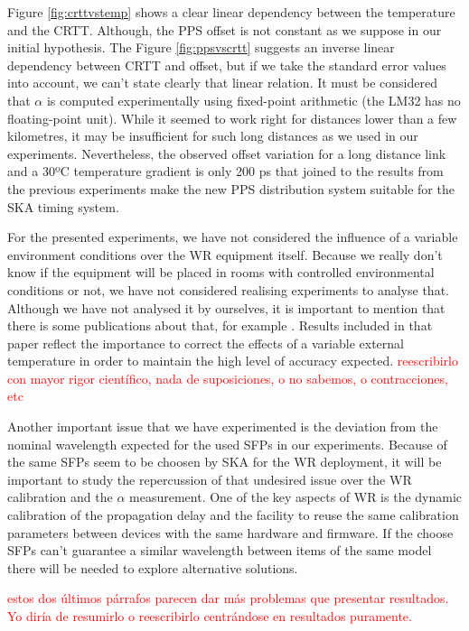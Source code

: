 Figure \ref{fig:crttvstemp} shows a clear linear dependency between the 
temperature and the CRTT. Although, the PPS offset is not constant as 
we suppose in our initial hypothesis. The Figure \ref{fig:ppsvscrtt} suggests 
an inverse linear dependency between CRTT and offset, but if we take the 
standard error values into account, we can't state clearly that linear 
relation. It must be considered that $\alpha$ is computed experimentally using 
fixed-point arithmetic (the LM32 has no floating-point unit). While it seemed 
to work right for distances lower than a few kilometres, it may be insufficient 
for such long distances as we used in our experiments. Nevertheless, the 
observed offset variation for a long distance link and a 30ºC temperature 
gradient is only 200 ps that joined to the results from the previous 
experiments make the new PPS distribution system suitable for the SKA 
timing system.

For the presented experiments, we have not considered the influence of a variable environment conditions over the WR equipment itself. Because we really don't know if the equipment will be placed in rooms with controlled environmental conditions or not, we have not considered realising experiments to analyse that. Although we have not analysed it by ourselves, it is important to mention that there is some publications about that, for example \cite{Li2015a}. Results included in that paper reflect the importance to correct the effects of a variable external temperature in order to maintain the high level of accuracy expected. \textcolor{red}{reescribirlo con mayor rigor científico, nada de suposiciones, o no sabemos, o contracciones, etc}


Another important issue that we have experimented is the deviation from the nominal wavelength expected for the used SFPs in our experiments. Because of the same SFPs seem to be choosen by SKA for the WR deployment, it will be important to study the repercussion of that undesired issue over the WR calibration and the $\alpha$ measurement. One of the key aspects of WR is the dynamic calibration of the propagation delay and the facility to reuse the same calibration parameters between devices with the same hardware and firmware. If the choose SFPs can't guarantee a similar wavelength between items of the same model there will be needed to explore alternative solutions.

\textcolor{red}{estos dos últimos párrafos parecen dar más problemas que presentar resultados. Yo diría de resumirlo o reescribirlo centrándose en resultados puramente.}
